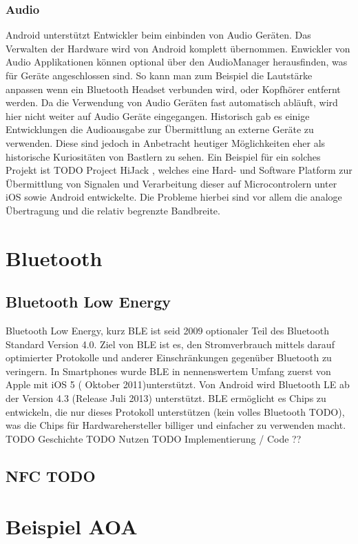 \documentclass[12pt,journal,compsoc]{IEEEtran}
\begin{document}
\subsubsection{Audio}
Android unterstützt Entwickler beim einbinden von Audio Geräten. Das Verwalten der Hardware wird von Android komplett übernommen.
Enwickler von Audio Applikationen können optional über den AudioManager herausfinden, was für Geräte angeschlossen sind. So kann man zum Beispiel die Lautstärke anpassen wenn ein Bluetooth Headset verbunden wird, oder Kopfhörer entfernt werden.
Da die Verwendung von Audio Geräten fast automatisch abläuft, wird hier nicht weiter auf Audio Geräte eingegangen.
Historisch gab es einige Entwicklungen die Audioausgabe zur Übermittlung an externe Geräte zu verwenden. Diese sind jedoch in Anbetracht heutiger Möglichkeiten eher als historische Kuriositäten von Bastlern zu sehen.
Ein Beispiel für ein solches Projekt ist TODO Project HiJack , welches eine Hard- und Software Platform zur Übermittlung von Signalen und Verarbeitung dieser auf Microcontrolern unter iOS sowie Android entwickelte.
Die Probleme hierbei sind vor allem die analoge Übertragung und die relativ begrenzte Bandbreite.
\section{Bluetooth}
\subsection{Bluetooth Low Energy}
Bluetooth Low Energy, kurz BLE ist seid 2009 optionaler Teil des Bluetooth Standard Version 4.0. 
Ziel von BLE ist es, den Stromverbrauch mittels darauf optimierter Protokolle und anderer Einschränkungen gegenüber Bluetooth zu veringern.
In Smartphones wurde BLE in nennenswertem Umfang zuerst von Apple mit iOS 5 ( Oktober 2011)unterstützt.
Von Android wird Bluetooth LE ab der Version 4.3 (Release Juli 2013) unterstützt.
BLE ermöglicht es Chips zu entwickeln, die nur dieses Protokoll unterstützen (kein volles Bluetooth TODO), was die Chips für Hardwarehersteller billiger und einfacher zu verwenden macht.
TODO Geschichte
TODO Nutzen
TODO Implementierung / Code ??


\subsection{NFC TODO}




\section{Beispiel AOA}
\end{document}
